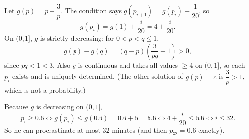 Let $g(p)=p+\dfrac3p$. The condition says $g(p_{i+1})=g(p_i)+\dfrac1{20}$, so
\[g(p_i)=g(1)+\dfrac{i}{20}=4+\dfrac{i}{20}.\]
On $(0,1]$, $g$ is strictly decreasing: for $0<p<q\le1$,
\[g(p)-g(q)=(q-p)\left(\dfrac{3}{pq}-1\right)>0,\]
since $pq<1<3$. Also $g$ is continuous and takes all values $\ge4$ on $(0,1]$, so each $p_i$ exists and is uniquely determined. (The other solution of $g(p)=c$ is $\dfrac3p>1$, which is not a probability.)

Because $g$ is decreasing on $(0,1]$,
\[p_i\ge0.6\iff g(p_i)\le g(0.6)=0.6+5=5.6\iff4+\dfrac{i}{20}\le5.6\iff i\le32.\]
So he can procrastinate at most $\boxed{32}$ minutes (and then $p_{32}=0.6$ exactly).
